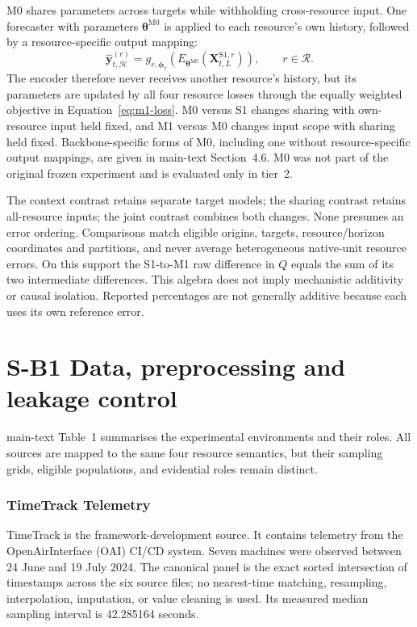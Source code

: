 \documentclass[a4paper,11pt]{article}
\begin{document}
M0 shares parameters across targets while withholding cross-resource input.
One forecaster with parameters $\boldsymbol{\theta}^{\mathrm{M0}}$ is applied
to each resource's own history, followed by a resource-specific output
mapping:
\begin{equation}
  \widehat{\mathbf{y}}_{t,\mathcal{H}}^{(r)}
  = g_{r,\boldsymbol{\phi}_r}\!\left(
      E_{\boldsymbol{\theta}^{\mathrm{M0}}}
      (\mathbf{X}_{t,L}^{\mathrm{S1},r})\right),
  \qquad r\in\mathcal{R}.
  \label{eq:m0-forecast}
\end{equation}
The encoder therefore never receives another resource's history, but its
parameters are updated by all four resource losses through the equally
weighted objective in Equation~\ref{eq:m1-loss}. M0 versus S1 changes sharing
with own-resource input held fixed, and M1 versus M0 changes input scope with
sharing held fixed. Backbone-specific forms of M0, including one without
resource-specific output mappings, are given in
main-text Section~4.6. M0 was not part of the original frozen
experiment and is evaluated only in tier~2.


The context contrast retains separate target models; the sharing contrast
retains all-resource inputs; the joint contrast combines both changes.
None presumes an error ordering. Comparisons match eligible origins, targets,
resource/horizon coordinates and partitions, and never average heterogeneous
native-unit resource errors. On this support the S1-to-M1 raw difference in
$Q$ equals the sum of its two intermediate differences. This algebra does
not imply mechanistic additivity or causal isolation. Reported percentages
are not generally additive because each uses its own reference error.

\clearpage
\section*{S-B1 Data, preprocessing and leakage control}
main-text Table~1 summarises the experimental environments and
their roles.  All sources are mapped to the same four resource semantics, but
their sampling grids, eligible populations, and evidential roles remain
distinct.

\subsubsection*{TimeTrack Telemetry}


TimeTrack is the framework-development source.  It contains telemetry from the
OpenAirInterface (OAI) CI/CD system.  Seven machines were observed between
24 June and 19 July 2024.  The canonical panel
is the exact sorted intersection of timestamps across the six source files; no
nearest-time matching, resampling, interpolation, imputation, or value cleaning
is used.  Its measured median sampling interval is 42.285164 seconds.
\end{document}
